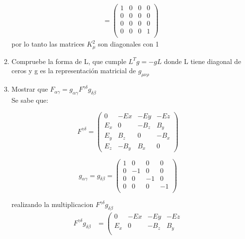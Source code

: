 \documentclass[12pt,letterpaper]{report}
\begin{document}
\begin{enumerate}
\begin{align*}
        & =\left( \begin{matrix}
            1 & 0 & 0 & 0 \\
            0 & 0 & 0 & 0 \\
            0 & 0 & 0 & 0 \\
            0 & 0 & 0 & 1 \\
        \end{matrix}\right)
    \end{align*}
    por lo tanto las matrices $K_\mu^2$ son diagonales con 1
    \item Compruebe la forma de L, que cumple $L^Tg=-gL$ donde L tiene diagonal de ceros y g es la representación matricial de $g_{\mu \nu \rho}$
    \item Mostrar que $F_{\alpha\gamma}=g_{\alpha\gamma}F^{\gamma \delta}g_{\delta \beta }$\\
    Se sabe que:\\
    \begin{minipage}{0.5\linewidth}
    \begin{equation*}
        F^{\gamma \delta} = \left( \begin{matrix}
            0 & -Ex & -Ey   & -Ez \\
            E_x &  0  & -B_z & B_y \\
            E_y & B_z & 0 &-B_x \\
            E_z & -B_y & B_x & 0  
        \end{matrix}\right)
    \end{equation*}
\end{minipage}
\begin{minipage}{0.5\linewidth}
\begin{equation*}
    g_{\alpha \gamma} = g_{\delta \beta} =\left(\begin{matrix}
        1 & 0 & 0 & 0\\
        0 & -1 & 0 & 0\\
        0 & 0 & -1 & 0\\
        0 & 0 & 0 & -1\\
    \end{matrix}\right)
\end{equation*}
\end{minipage}
realizando la multiplicacion $F^{\gamma \delta}g_{\delta \beta }$
\begin{align*}
    F^{\gamma \delta}g_{\delta \beta }&= \left( \begin{matrix}
        0 & -Ex & -Ey   & -Ez \\
        E_x &  0  & -B_z & B_y \\

\end{matrix}
\end{align*}
\end{enumerate}
\end{document}
